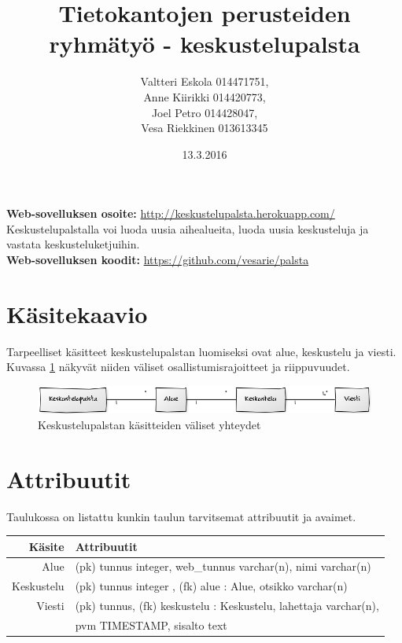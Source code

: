 \documentclass[titlepage]{article}
\title{Tietokantojen perusteiden ryhm\"aty\"o - keskustelupalsta}
\author{Valtteri Eskola 014471751, \\ Anne Kiirikki 014420773, \\ Joel Petro 014428047, \\ Vesa Riekkinen 013613345}
\date{13.3.2016}
\begin{document}
\maketitle

\noindent \textbf{Web-sovelluksen osoite:} \href{http://keskustelupalsta.herokuapp.com/}{http://keskustelupalsta.herokuapp.com/} \\
\noindent Keskustelupalstalla voi luoda uusia aihealueita, luoda uusia keskusteluja ja vastata keskusteluketjuihin.\\

\noindent \textbf{Web-sovelluksen koodit:} \href{https://github.com/vesarie/palsta}{https://github.com/vesarie/palsta}

\section*{Käsitekaavio}
Tarpeelliset käsitteet keskustelupalstan luomiseksi  ovat alue, keskustelu ja viesti. Kuvassa \ref{kasite} näkyvät niiden väliset osallistumisrajoitteet ja riippuvuudet.

\begin{figure}[H]
\includegraphics[width=\textwidth]{kasitekaavio}
\caption{Keskustelupalstan käsitteiden väliset yhteydet}
\label{kasite}
\end{figure}

\section*{Attribuutit}

\noindent Taulukossa on listattu kunkin taulun tarvitsemat attribuutit ja avaimet. \\

{
\centering
\begin{tabular}[width=\textwidth]{r|l}

Käsite & Attribuutit \\
\hline
Alue & (pk) tunnus integer, web{\_}tunnus varchar(n), nimi varchar(n) \\
Keskustelu & (pk) tunnus integer , (fk) alue : Alue,  otsikko varchar(n) \\
Viesti & (pk) tunnus, (fk) keskustelu : Keskustelu, lahettaja varchar(n), \\
& pvm TIMESTAMP, sisalto text \\
\end{tabular}
} \\
\end{document}
